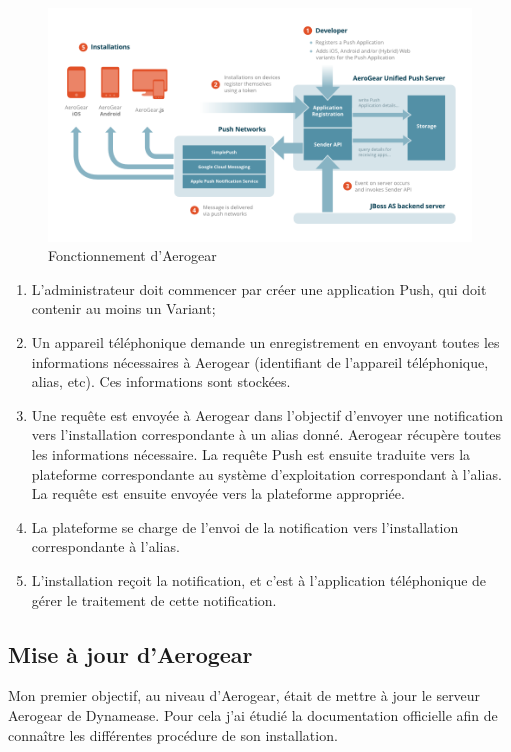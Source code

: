 \begin{figure}[!h]
	\includegraphics[scale=0.6]{img/aerogear_unified_push_server.png}
	\caption{\label{aerogear} Fonctionnement d'Aerogear}
\end{figure}


\begin{enumerate}
 \item L'administrateur doit commencer par créer une application Push, qui doit contenir au moins un Variant;
 \item Un appareil téléphonique demande un enregistrement en envoyant toutes les informations nécessaires à Aerogear (identifiant de l'appareil téléphonique, alias, etc). Ces informations sont stockées.
 \item Une requête est envoyée à  Aerogear dans l'objectif d'envoyer une notification vers l'installation correspondante à un alias donné. Aerogear récupère toutes les informations nécessaire. La requête Push est ensuite traduite vers la plateforme correspondante au système d'exploitation correspondant à l'alias. La requête est ensuite envoyée vers la plateforme appropriée.
 \item La plateforme se charge de l'envoi de la notification vers l'installation correspondante à l'alias.
 \item L'installation reçoit la notification, et c'est à l'application téléphonique de gérer le traitement de cette notification.
\end{enumerate}

\subsection{Mise à jour d'Aerogear}

Mon premier objectif, au niveau d'Aerogear, était de mettre à jour le serveur Aerogear de Dynamease. Pour cela j'ai étudié la documentation officielle afin de connaître les différentes procédure de son installation.

